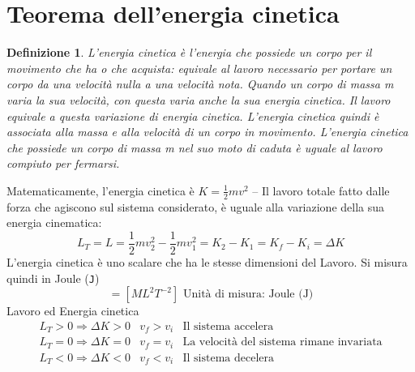 \documentclass{book}
\newtheorem{defi}{Definizione}
\begin{document}
\section{Teorema dell'energia cinetica}
\begin{defi}
	L'energia cinetica è l'energia che possiede un corpo per il movimento che ha
	o che acquista: equivale al lavoro necessario per portare un corpo da una 
	velocità nulla a una velocità nota. Quando un corpo di massa m varia la sua 
	velocità, con questa varia anche la sua energia cinetica. Il lavoro equivale
	a questa variazione di energia cinetica. L'energia cinetica quindi è
	associata alla massa e alla velocità di un corpo in movimento. L'energia
	cinetica che possiede un corpo di massa m nel suo moto di caduta è uguale al
	lavoro compiuto per fermarsi.
\end{defi}
Matematicamente, l'energia cinetica è $K=\frac{1}{2}mv^2$ -- Il lavoro totale
fatto dalle forza che agiscono sul sistema considerato, è uguale alla
variazione della sua energia cinematica:
\begin{equation*}
	\boxed{L_T=L=\frac{1}{2}mv_2^2-\frac{1}{2}mv_1^2=K_2-K_1=K_f-K_i=\Delta K}
\end{equation*}
L'energia cinetica è uno scalare che ha le stesse dimensioni del Lavoro. Si
misura quindi in Joule ({\tt J})
\begin{equation*}
	[K]=[ML^2T^{-2}] \text{ Unità di misura: Joule (J)}
\end{equation*}
Lavoro ed Energia cinetica
\begin{eqnarray*}
	L_T>0\Rightarrow \Delta K>0 &v_f>v_i & \text{Il sistema accelera}\\
	L_T=0\Rightarrow \Delta K=0 &v_f=v_i & \text{La velocità del sistema rimane
	invariata}\\
	L_T<0\Rightarrow \Delta K<0 &v_f<v_i & \text{Il sistema decelera}
\end{eqnarray*}


\end{document}

